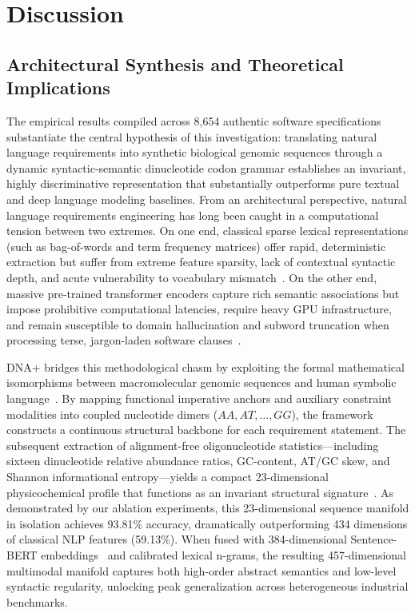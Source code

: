 \section{Discussion}

\subsection{Architectural Synthesis and Theoretical Implications}
The empirical results compiled across 8,654 authentic software specifications substantiate the central hypothesis of this investigation: translating natural language requirements into synthetic biological genomic sequences through a dynamic syntactic-semantic dinucleotide codon grammar establishes an invariant, highly discriminative representation that substantially outperforms pure textual and deep language modeling baselines. From an architectural perspective, natural language requirements engineering has long been caught in a computational tension between two extremes. On one end, classical sparse lexical representations (such as bag-of-words and term frequency matrices) offer rapid, deterministic extraction but suffer from extreme feature sparsity, lack of contextual syntactic depth, and acute vulnerability to vocabulary mismatch~\cite{ref1,ref2,ref4}. On the other end, massive pre-trained transformer encoders capture rich semantic associations but impose prohibitive computational latencies, require heavy GPU infrastructure, and remain susceptible to domain hallucination and subword truncation when processing terse, jargon-laden software clauses~\cite{ref3,ref5}.

DNA+ bridges this methodological chasm by exploiting the formal mathematical isomorphisms between macromolecular genomic sequences and human symbolic language~\cite{ref6,ref8}. By mapping functional imperative anchors and auxiliary constraint modalities into coupled nucleotide dimers ($AA, AT, \dots, GG$), the framework constructs a continuous structural backbone for each requirement statement. The subsequent extraction of alignment-free oligonucleotide statistics—including sixteen dinucleotide relative abundance ratios, GC-content, AT/GC skew, and Shannon informational entropy—yields a compact 23-dimensional physicochemical profile that functions as an invariant structural signature~\cite{ref7,ref9,ref10}. As demonstrated by our ablation experiments, this 23-dimensional sequence manifold in isolation achieves 93.81\% accuracy, dramatically outperforming 434 dimensions of classical NLP features (59.13\%). When fused with 384-dimensional Sentence-BERT embeddings~\cite{ref11} and calibrated lexical n-grams, the resulting 457-dimensional multimodal manifold captures both high-order abstract semantics and low-level syntactic regularity, unlocking peak generalization across heterogeneous industrial benchmarks.

